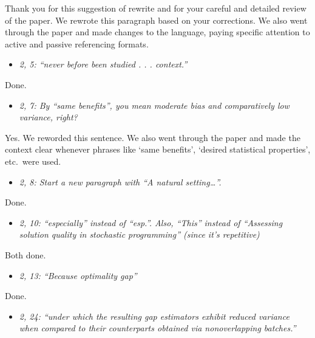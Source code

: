 \documentclass[11pt,notitlepage,onecolumn]{article}
\newcommand{\noi}{\noindent}
\begin{document}
\noi
Thank you for this suggestion of rewrite and for your careful and detailed review of the paper. 
We rewrote this paragraph based on your corrections.
We also went through the paper and made changes to the language, paying specific attention to active and passive referencing formats. 
\medskip 


\begin{itemize}
\item[] \textit{2, 5: ``never before been studied . . . context.''}
\end{itemize}

\noi
Done.
\medskip 


\begin{itemize}
\item[] \textit{2, 7: By ``same benefits'', you mean moderate bias and comparatively low variance, right?}
\end{itemize}

\noi
Yes. We reworded this sentence. 
We also went through the paper and made the context clear whenever phrases like `same benefits', `desired statistical properties', etc.\ were used.  
\medskip 


\begin{itemize}
\item[] \textit{2, 8: Start a new paragraph with ``A natural setting\ldots ''.}
\end{itemize}

\noi
Done.
\medskip 


\begin{itemize}
\item[] \textit{2, 10: ``especially'' instead of ``esp.''. 
Also, ``This'' instead of ``Assessing solution quality in stochastic programming'' (since it's repetitive)}
\end{itemize}

\noi
Both done.  
\medskip 


\begin{itemize}
\item[] \textit{2, 13: ``Because optimality gap''}
\end{itemize}

\noi
Done.
\medskip 


\begin{itemize}
\item[] \textit{2, 24: ``under which the resulting gap estimators exhibit reduced variance when compared to their counterparts obtained via nonoverlapping batches.''}
\end{itemize}
\end{document}
